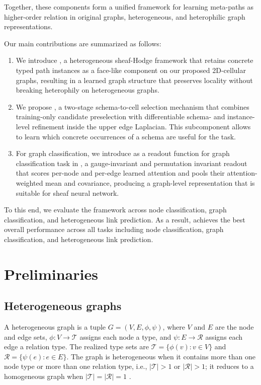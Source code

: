 Together, these components form a unified framework for learning meta-paths as higher-order relation in original graphs, heterogeneous, and heterophilic graph representations.




Our main contributions are summarized as follows:
\begin{enumerate}
  \item We introduce \method{}, a heterogeneous sheaf-Hodge framework that retains concrete typed
  path instances as a face-like component on our proposed 2D-cellular graphs, resulting in a learned graph structure that preserves locality without breaking heterophily on heterogeneous graphs.
  \item We propose \ampss{}, a two-stage schema-to-cell selection mechanism that combines
  training-only candidate preselection with differentiable schema- and instance-level refinement
  inside the upper edge Laplacian. This subcomponent allows \method{} to learn which concrete occurrences
  of a schema are useful for the task.
  \item For graph classification, we introduce \sheafcovpool{} as a readout function for graph classification task in \method{}, a gauge-invariant and permutation invariant readout that scores per-node and per-edge learned attention and pools their
  attention-weighted mean and covariance, producing a graph-level representation that is suitable for sheaf neural network.
\end{enumerate}

To this end, we evaluate the framework across node classification, graph classification, and
heterogeneous link prediction. As a result, \method{} achieves the best overall performance across all tasks including node classification, graph classification, and heterogeneous link prediction.

\section{Preliminaries}
\label{sec:background}


\subsection{Heterogeneous graphs}

A heterogeneous graph is a tuple $G=(V,E,\phi,\psi)$, where $V$ and $E$ are the node and edge
sets, $\phi:V\rightarrow\mathcal{T}$ assigns each node a type, and
$\psi:E\rightarrow\mathcal{R}$ assigns each edge a relation type. The realized type sets are
$\mathcal{T}=\{\phi(v):v\in V\}$ and $\mathcal{R}=\{\psi(e):e\in E\}$. The graph is heterogeneous
when it contains more than one node type or more than one relation type, i.e.,
$|\mathcal{T}|>1$ or $|\mathcal{R}|>1$; it reduces to a homogeneous graph when
$|\mathcal{T}|=|\mathcal{R}|=1$ \cite{lu2026addressing}.

